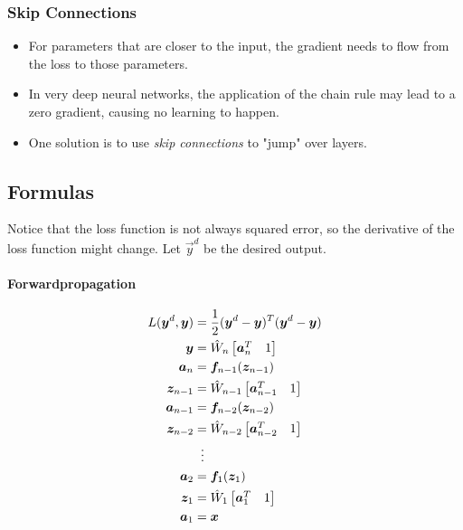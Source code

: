 			\subsubsection{Skip Connections}
				\begin{itemize}
					\item For parameters that are closer to the input, the gradient needs to flow from the loss to those parameters.
					\item In very deep neural networks, the application of the chain rule may lead to a zero gradient, causing no learning to happen.
					\item One solution is to use \emph{skip connections} to "jump" over layers.
				\end{itemize}

		\subsection{Formulas}
			Notice that the loss function is not always squared error, so the derivative of the loss function might change. Let \(\vec{y}^d\) be the desired output.
			
			\paragraph{Forwardpropagation}
				\begin{align}
					L(\vec{y}^d, \vec{y}) &= \frac{1}{2} (\vec{y}^d - \vec{y})^T (\vec{y}^d - \vec{y}) \\
					\vec{y} &= \hat{W}_n \begin{bmatrix} \vec{a}_n^T & 1 \end{bmatrix} \\
					\vec{a}_n &= \vec{f}_{n - 1} (\vec{z}_{n - 1}) \\
					\vec{z}_{n - 1} &= \hat{W}_{n - 1} \begin{bmatrix} \vec{a}_{n - 1}^T & 1 \end{bmatrix} \\
					\vec{a}_{n - 1} &= \vec{f}_{n - 2} (\vec{z}_{n - 2}) \\
					\vec{z}_{n - 2} &= \hat{W}_{n - 2} \begin{bmatrix} \vec{a}_{n - 2}^T & 1 \end{bmatrix} \\
					&\hspace{0.2cm}\vdots \\
					\vec{a}_2 &= \vec{f}_1(\vec{z}_1) \\
					\vec{z}_1 &= \hat{W}_1 \begin{bmatrix} \vec{a}_1^T & 1 \end{bmatrix} \\
					\vec{a}_1 &= \vec{x}
				\end{align}
			
